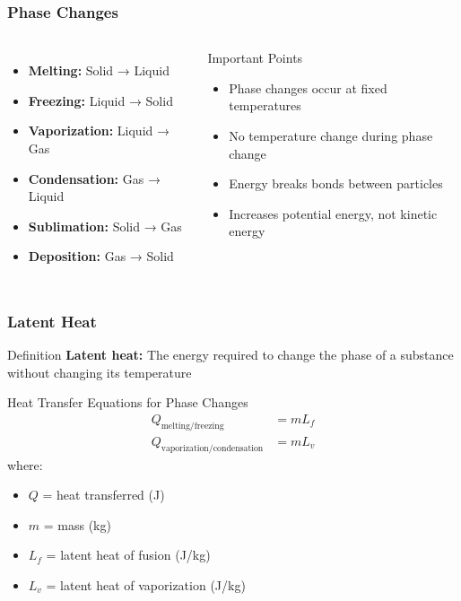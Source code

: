 \documentclass{beamer}
\begin{document}
\begin{frame}
    \frametitle{Phase Changes}
    \begin{columns}
        \begin{itemize}
            \item \textbf{Melting:} Solid → Liquid
            \item \textbf{Freezing:} Liquid → Solid
            \item \textbf{Vaporization:} Liquid → Gas
            \item \textbf{Condensation:} Gas → Liquid
            \item \textbf{Sublimation:} Solid → Gas
            \item \textbf{Deposition:} Gas → Solid
        \end{itemize}
        
        \begin{block}{Important Points}
            \begin{itemize}
                \item Phase changes occur at fixed temperatures
                \item No temperature change during phase change
                \item Energy breaks bonds between particles
                \item Increases potential energy, not kinetic energy
            \end{itemize}
        \end{block}
    \end{columns}
\end{frame}

\begin{frame}
    \frametitle{Latent Heat}
    \begin{block}{Definition}
        \textbf{Latent heat:} The energy required to change the phase of a substance without changing its temperature
    \end{block}
    
    \begin{alertblock}{Heat Transfer Equations for Phase Changes}
        \begin{align*}
            Q_{\text{melting/freezing}} &= mL_f \\
            Q_{\text{vaporization/condensation}} &= mL_v
        \end{align*}
        where:
        \begin{itemize}
            \item $Q$ = heat transferred (J)
            \item $m$ = mass (kg)
            \item $L_f$ = latent heat of fusion (J/kg)
            \item $L_v$ = latent heat of vaporization (J/kg)
        \end{itemize}
    \end{alertblock}
\end{frame}
\end{document}
